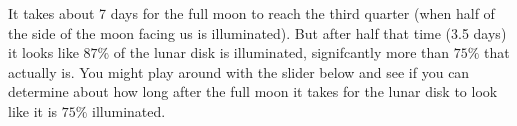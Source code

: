 \documentclass{ximera}
\begin{document}
It takes about 7 days for the full moon to reach the third quarter (when half of the side of the moon facing us is illuminated). But after half that time (3.5 days) it looks like $87\%$ of the lunar disk is illuminated, signifcantly more than $75\%$ that actually is. You might play around with the slider below and see if you can determine about how long after the full moon it takes for the lunar disk to look like it is $75\%$ illuminated.

 
\begin{onlineOnly}
    \begin{center}
\end{center}
\end{onlineOnly}
\end{document}
